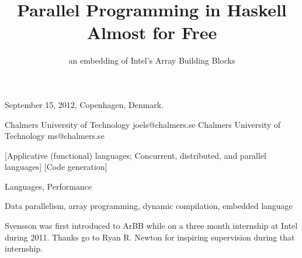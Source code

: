 \documentclass{sigplanconf}
\begin{document}
 {September 15, 2012, Copenhagen, Denmark.}

\titlebanner{}        %
\preprintfooter{}   %

\title{Parallel Programming in Haskell Almost for Free} 
\subtitle{an embedding of Intel's Array Building Blocks}


           {Chalmers University of Technology}
           {joels@chalmers.se}
           {Chalmers University of Technology}
           {ms@chalmers.se}

\maketitle

\begin{abstract}

\end{abstract}

[Applicative (functional) languages; Concurrent, distributed, and parallel languages]
[Code generation]

\terms
Languages, Performance

\keywords
Data parallelism, array programming, dynamic compilation, embedded language

%


 




%

 



\acks

Svensson was first introduced to ArBB while on a three month internship at Intel
during 2011. Thanks go to Ryan R. Newton for inspiring supervision 
during that internship.
\end{document}
